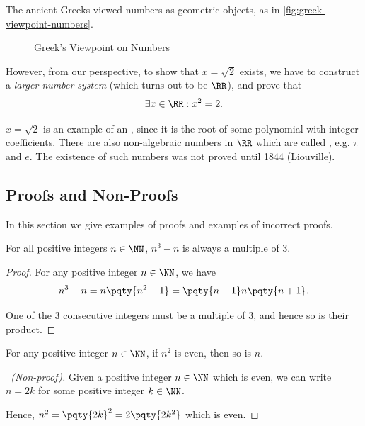 The ancient Greeks viewed numbers as geometric objects, as in \autoref{fig:greek-viewpoint-numbers}.

\begin{figure}[ht!]
    \centering
    \caption{Greek's Viewpoint on Numbers}
    \label{fig:greek-viewpoint-numbers}
\end{figure}

However, from our perspective, to show that \(x = \sqrt{2}\) exists, we have to construct a \emph{larger number system} (which turns out to be \(\RR\)), and prove that
\[
    \exists x \in \RR: x^2 = 2.
\]

\(x = \sqrt{2}\) is an example of an , since it is the root of some polynomial with integer coefficients. There are also non-algebraic numbers in \(\RR\) which are called , e.g. \(\pi\) and \(e\). The existence of such numbers was not proved until 1844 (Liouville).

\subsection{Proofs and Non-Proofs}
\label{sec:proofs-non-proofs}

In this section we give examples of proofs and examples of incorrect proofs.

\begin{claim}
    For all positive integers \(n \in \NN\), \(n^3 - n\) is always a multiple of \(3\).
\end{claim}

\begin{proof}
    For any positive integer \(n \in \NN\), we have
    \[
        n^3 - n = n \pqty{n^2 - 1} = \pqty{n - 1} n \pqty{n + 1}.
    \]

    One of the \(3\) consecutive integers must be a multiple of \(3\), and hence so is their product.
\end{proof}

\begin{claim}
    For any positive integer \(n \in \NN\), if \(n^2\) is even, then so is \(n\).
\end{claim}

\begin{proof}[\proofname\ (Non-proof)]
    Given a positive integer \(n \in \NN\) which is even, we can write \(n = 2k\) for some positive integer \(k \in \NN\).

    Hence, \(n^2 = \pqty{2k}^2 = 2 \pqty{2k^2}\) which is even.
\end{proof}

